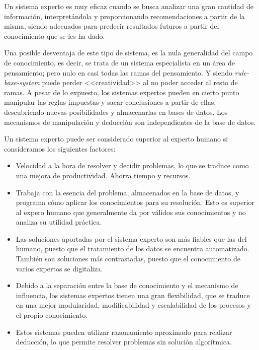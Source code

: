 \documentclass[a4paper, 11pt, titlepage]{article}
\begin{document}
    Un sistema experto es muy eficaz cuando se busca analizar una gran cantidad de información, 
    interpretándola y proporcionando recomendaciones a partir de la misma, siendo adecuados para
    predecir resultados futuros a partir del conocimiento que se les ha dado.

    Una posible desventaja de este tipo de sistema, es la nula generalidad del campo de conocimiento, 
    es decir, se trata de un sistema especialista en un área de pensamiento; pero nulo en casi todas 
    las ramas del pensamiento. Y siendo \textit{rule-base-system} puede perder <<creatividad>> al 
    no poder acceder al resto de ramas. A pesar de lo expuesto, los sistemas expertos pueden 
    en cierto punto manipular las reglas impuestas y sacar conclusiones a partir de ellas, 
    descubriendo nuevas posibilidades y almacenarlas en bases de datos. Los mecanismos de 
    manipulación y deducción son independientes de la base de datos.

    Un sistema experto puede ser considerado superior al experto humano si consideramos los
    siguientes factores:

    \begin{itemize}
        \item Velocidad a la hora de resolver y decidir problemas, lo que se traduce como una 
        mejora de productividad. Ahorra tiempo y recursos.
        \item Trabaja con la esencia del problema, almacenados en la base de datos, y programa 
        cómo aplicar los conocimientos para su resolución. Esto es superior al expero humano que 
        generalmente da por válidos sus conocimientos y no analiza su utilidad práctica.
        \item Las soluciones aportadas por el sistema experto son más fiables que las del humano, 
        puesto que el tratamiento de los datos se encuentra automatizado. También son soluciones 
        más contrastadas, puesto que el conocimiento de varios expertos se digitaliza.
        \item Debido a la separación entre la base de conocimiento y el mecanismo de influencia, 
        los sistemas expertos tienen una gran flexibilidad, que se traduce en una mejor modularidad, 
        modificabilidad y escalabilidad de los procesos y el propio conocimiento.
        \item Estos sistemas pueden utilizar razonamiento aproximado para realizar deducción, lo que 
        permite resolver problemas sin solución algorítmica.
    \end{itemize}
\end{document}
